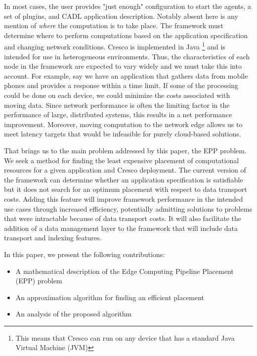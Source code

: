 \documentclass{article}
\begin{document}
    In most cases, the user provides "just enough" configuration to start the agents, a set of plugins, and CADL application description. Notably absent here is any mention of \textit{where} the computation is to take place. The framework must determine where to perform computations based on the application specification and changing network conditions. Cresco is implemented in Java \footnote{This means that Cresco can run on any device that has a standard Java Virtual Machine (JVM)}
    and is intended for use in heterogeneous environments. Thus, the characteristics of each node in the framework are expected to vary widely and we must take this into account. For example, say we have an application that gathers data from mobile phones and provides a response within a time limit. If some of the processing could be done on each device, we could minimize the costs associated with moving data. Since network performance is often the limiting factor in the performance of large, distributed systems, this results in a net performance improvement. Moreover, moving computation to the network edge allows us to meet latency targets that would be infeasible for purely cloud-based solutions.
    
    That brings us to the main problem addressed by this paper, the EPP problem.  We seek a method for finding the least expensive placement of computational resources for a given application and Cresco deployment. The current version of the framework can determine whether an application specification is satisfiable but it does not search for an optimum placement with respect to data transport costs. Adding this feature will improve framework performance in the intended use cases through increased efficiency, potentially admitting solutions to problems that were intractable because of data transport costs. It will also facilitate the addition of a data management layer to the framework that will include data transport and indexing features.
    
    In this paper, we present the following contributions:
    \begin{itemize}
    	\item A mathematical description of the Edge Computing Pipeline Placement (EPP) problem
    	\item An approximation algorithm for finding an efficient placement
 	    \item An analysis of the proposed algorithm
    \end{itemize}
    
\end{document}

